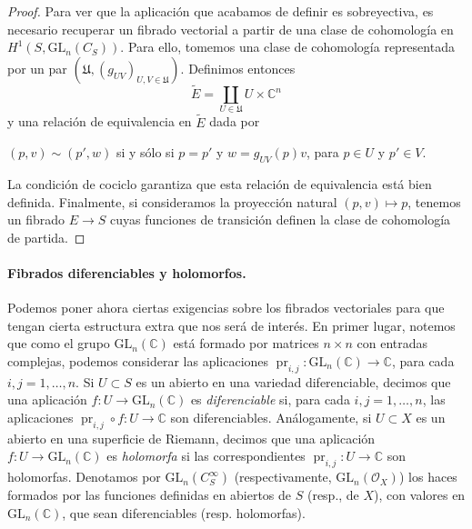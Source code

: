 \documentclass[12pt,a4paper]{article}
\theoremstyle{definition} \newtheorem{defn}[thm]{Definición}
\theoremstyle{definition} \newtheorem{ejemplo}[thm]{Ejemplo}
\theoremstyle{definition} \newtheorem{ejercicio}[thm]{Ejercicio}
\def\CC{\mathbb{C}}
\def\OO{\mathscr{O}}
\def\UU{\mathfrak{U}}
\def\GL{\mathrm{GL}}
\DeclareMathOperator{\pr}{pr}
\begin{document}
\begin{proof}
	  Para ver que la aplicación que acabamos de definir es sobreyectiva, es necesario recuperar un fibrado vectorial a partir de una clase de cohomología en $H^1(S,\GL_n(C_S))$. Para ello, tomemos una clase de cohomología representada por un par $(\UU,(g_{UV})_{U,V \in \UU})$. Definimos entonces
	  \begin{equation*}
	    \tilde{E} = \coprod_{U\in \UU} U \times \CC^n
	  \end{equation*}
	  y una relación de equivalencia en $\tilde{E}$ dada por
	  \begin{center}
	    $(p,v) \sim (p',w)$ si y sólo si $p=p'$ y $w=g_{UV}(p) v$, para $p\in U$ y $p'\in V$.
	  \end{center}
La condición de cociclo garantiza que esta relación de equivalencia está bien definida. Finalmente, si consideramos la proyección natural $(p,v)\mapsto p$, tenemos un fibrado $E\rightarrow S$ cuyas funciones de transición definen la clase de cohomología de partida. 
	  \end{proof}

	  \paragraph{Fibrados diferenciables y holomorfos.}	  Podemos poner ahora ciertas exigencias sobre los fibrados vectoriales para que tengan cierta estructura extra que nos será de interés. En primer lugar, notemos que como el grupo $\GL_n(\CC)$ está formado por matrices $n\times n$ con entradas complejas, podemos considerar las aplicaciones $\pr_{i,j}:\GL_n(\CC) \rightarrow \CC$, para cada $i,j = 1,\dots,n$. Si $U\subset S$ es un abierto en una variedad diferenciable, decimos que una aplicación $f:U\rightarrow \GL_n(\CC)$ es \emph{diferenciable} si, para cada $i,j=1,\dots,n$, las aplicaciones $\pr_{i,j}\circ f: U \rightarrow \CC$ son diferenciables. Análogamente, si $U\subset X$ es un abierto en una superficie de Riemann, decimos que una aplicación $f:U\rightarrow \GL_n(\CC)$ es \emph{holomorfa} si las correspondientes $\pr_{i,j}:U\rightarrow \CC$ son holomorfas. Denotamos por $\GL_n(C^\infty_S)$ (respectivamente, $\GL_n(\OO_X)$) los haces formados por las funciones definidas en abiertos de $S$ (resp., de $X$), con valores en $\GL_n(\CC)$, que sean diferenciables (resp. holomorfas).
\end{document}
